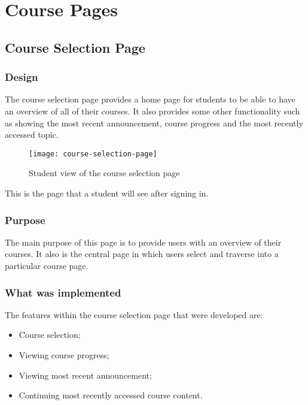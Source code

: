 \section{Course Pages}

\subsection{Course Selection Page}
\subsubsection{Design}
The course selection page provides a home page for students to be able to have an overview of all of their courses. It also provides some other functionality such as showing the most recent announcement, course progress and the most recently accessed topic.
\begin{figure}[h!]
    \centering
    \texttt{[image: course-selection-page]}
    \caption{Student view of the course selection page}
\end{figure}
This is the page that a student will see after signing in.

\subsubsection{Purpose}
The main purpose of this page is to provide users with an overview of their courses. It also is the central page in which users select and traverse into a particular course page.

\subsubsection{What was implemented}
The features within the course selection page that were developed are:
\begin{itemize}
    \item Course selection;
    \item Viewing course progress;
    \item Viewing most recent announcement;
    \item Continuing most recently accessed course content.
\end{itemize}

